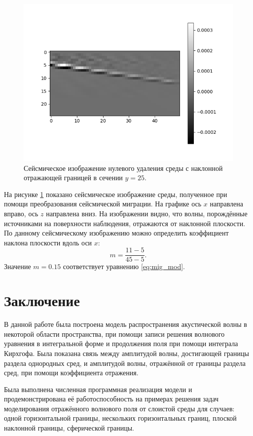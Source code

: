 \documentclass[a4paper, fontsize=14pt]{article}
\begin{document}
	
	\begin{figure}[H]
		\centering
		\includegraphics[width=.9\textwidth]{mig_tilted_central_ok.png}
		\caption{Сейсмическое изображение нулевого удаления среды с наклонной отражающей границей в сечении $y=25$.}
		\label{fig:mig_tilt}
	\end{figure}
	На рисунке \ref{fig:mig_tilt} показано сейсмическое изображение среды, полученное при помощи преобразования сейсмической миграции. 
	На графике ось $x$ направлена вправо, ось $z$ направлена вниз. На изображении видно, что волны, порождённые источниками на поверхности наблюдения, отражаются от наклонной плоскости.  По данному сейсмическому изображению можно определить коэффициент наклона плоскости вдоль оси $x$: $$m = \frac{11-5}{45-5}.$$ Значение $m=0.15$ соответствует уравнению \eqref{eq:mig_mod}. 
	
	
	\clearpage
	
	
	\section*{Заключение} 
	В данной работе была построена модель распространения  акустической волны в некоторой области
	 пространства, при помощи записи решения волнового уравнения в интегральной форме и продолжения поля при
	 помощи интеграла Кирхгофа. Была показана связь между амплитудой волны, достигающей границы раздела
	  однородных сред, и амплитудой волны, отражённой от границы раздела сред, при помощи коэффициента
	  отражения.
	
	Была выполнена численная программная реализация модели и продемонстрирована её работоспособность на примерах решения задач моделирования отражённого волнового поля от слоистой среды для случаев: одной горизонтальной границы, нескольких горизонтальных границ, плоской наклонной границы, сферической границы.
	
\end{document}
